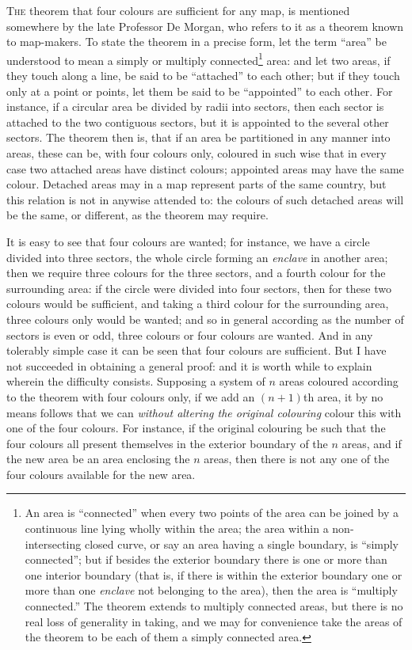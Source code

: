 \documentclass[11pt,a4paper]{book}
\begin{document}
\textsc{The} theorem that four colours are sufficient for any map, is mentioned somewhere by the late Professor De Morgan, who refers to it as a theorem known to map-makers. To state the theorem in a precise form, let the term ``area'' be understood to mean a simply or multiply connected\footnote{An area is ``connected'' when every two points of the area can be joined by a continuous line lying wholly within the area; the area within a non-intersecting closed curve, or say an area having a single boundary, is ``simply connected''; but if besides the exterior boundary there is one or more than one interior boundary (that is, if there is within the exterior boundary one or more than one \textit{enclave} not belonging to the area), then the area is ``multiply connected.'' The theorem extends to multiply connected areas, but there is no real loss of generality in taking, and we may for convenience take the areas of the theorem to be each of them a simply connected area.} area: and let two areas, if they touch along a line, be said to be ``attached'' to each other; but if they touch only at a point or points, let them be said to be ``appointed'' to each other. For instance, if a circular area be divided by radii into sectors, then each sector is attached to the two contiguous sectors, but it is appointed to the several other sectors. The theorem then is, that if an area be partitioned in any manner into areas, these can be, with four colours only, coloured in such wise that in every case two attached areas have distinct colours; appointed areas may have the same colour. Detached areas may in a map represent parts of the same country, but this relation is not in anywise attended to: the colours of such detached areas will be the same, or different, as the theorem may require.

It is easy to see that four colours are wanted; for instance, we have a circle divided into three sectors, the whole circle forming an \textit{enclave} in another area; then we require three colours for the three sectors, and a fourth colour for the surrounding area: if the circle were divided into four sectors, then for these two colours would be sufficient, and taking a third colour for the surrounding area, three colours only would be wanted; and so in general according as the number of sectors is even or odd, three colours or four colours are wanted. And in any tolerably simple case it can be seen that four colours are sufficient. But I have not succeeded in obtaining a general proof: and it is worth while to explain wherein the difficulty consists. Supposing a system of $n$ areas coloured according to the theorem with four colours only, if we add an $(n+1)$th area, it by no means follows that we can \textit{without altering the original colouring} colour this with one of the four colours. For instance, if the original colouring be such that the four colours all present themselves in the exterior boundary of the $n$ areas, and if the new area be an area enclosing the $n$ areas, then there is not any one of the four colours available for the new area.
\end{document}
